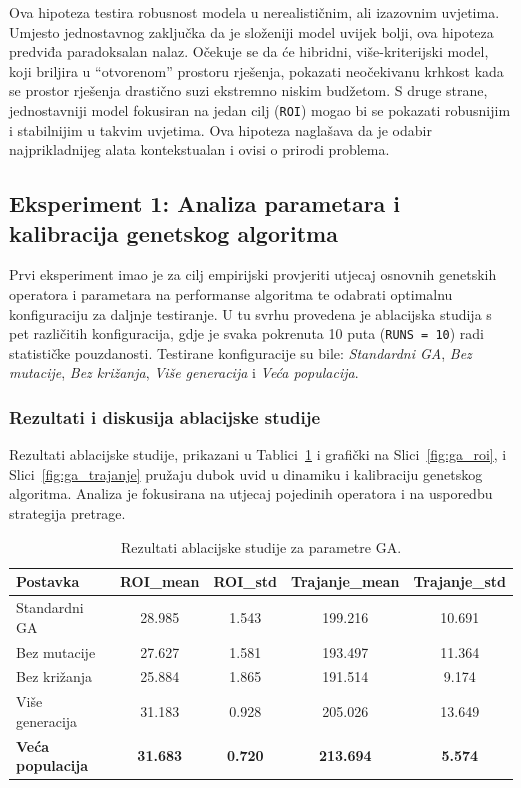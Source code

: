 \begin{description}
Ova hipoteza testira robusnost modela u nerealističnim, ali izazovnim uvjetima. Umjesto jednostavnog zaključka da je složeniji model uvijek bolji, ova hipoteza predviđa paradoksalan nalaz. Očekuje se da će hibridni, više-kriterijski model, koji briljira u ``otvorenom'' prostoru rješenja, pokazati neočekivanu krhkost kada se prostor rješenja drastično suzi ekstremno niskim budžetom. S druge strane, jednostavniji model fokusiran na jedan cilj (\texttt{ROI}) mogao bi se pokazati robusnijim i stabilnijim u takvim uvjetima. Ova hipoteza naglašava da je odabir najprikladnijeg alata kontekstualan i ovisi o prirodi problema.
\end{description}

\subsection{Eksperiment 1: Analiza parametara i kalibracija genetskog algoritma}

Prvi eksperiment imao je za cilj empirijski provjeriti utjecaj osnovnih genetskih operatora i parametara na performanse algoritma te odabrati optimalnu konfiguraciju za daljnje testiranje. U tu svrhu provedena je ablacijska studija s pet različitih konfiguracija, gdje je svaka pokrenuta 10 puta (\texttt{RUNS = 10}) radi statističke pouzdanosti. Testirane konfiguracije su bile: \emph{Standardni GA}, \emph{Bez mutacije}, \emph{Bez križanja}, \emph{Više generacija} i \emph{Veća populacija}.

\subsubsection{Rezultati i diskusija ablacijske studije} 

Rezultati ablacijske studije, prikazani u Tablici~\ref{tab:ga_ablation} i grafički na Slici~\ref{fig:ga_roi}, i Slici~\ref{fig:ga_trajanje} pružaju dubok uvid u dinamiku i kalibraciju genetskog algoritma. Analiza je fokusirana na utjecaj pojedinih operatora i na usporedbu strategija pretrage.

\begin{table}[H]
    \centering
    \caption{Rezultati ablacijske studije za parametre GA.}
    \label{tab:ga_ablation}
    \begin{tabular}{|l|c|c|c|c|}
        \hline
        \textbf{Postavka} & \textbf{ROI\_mean} & \textbf{ROI\_std} & \textbf{Trajanje\_mean} & \textbf{Trajanje\_std} \\
        \hline
        Standardni GA & 28.985 & 1.543 & 199.216 & 10.691 \\
        Bez mutacije & 27.627 & 1.581 & 193.497 & 11.364 \\
        Bez križanja & 25.884 & 1.865 & 191.514 & 9.174 \\
        Više generacija & 31.183 & 0.928 & 205.026 & 13.649 \\
        \textbf{Veća populacija} & \textbf{31.683} & \textbf{0.720} & \textbf{213.694} & \textbf{5.574} \\
        \hline
    \end{tabular}
\end{table}


